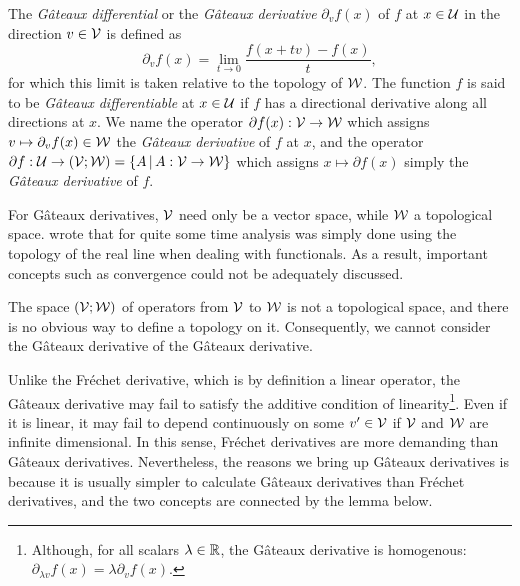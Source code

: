 \begin{definition}
  The \emph{Gâteaux differential} or the \emph{Gâteaux derivative} $\partial_v f(x)$ of $f$ at $x \in {\mathcal U}$ in the direction $v\in{\mathcal V}$ is defined as
  \[
    \partial_v f(x) = \lim_{t \to 0} \frac{f(x + t v) - f(x)}{t},  %
  \]  
  for which this limit is taken relative to the topology of ${\mathcal W}$.
  The function $f$ is said to be \emph{Gâteaux differentiable} at $x\in{\mathcal U}$ if $f$ has a directional derivative along all directions at $x$.
  We name the operator $\partial f(x):{\mathcal V}\to{\mathcal W}$ which assigns $v \mapsto \partial_v f(x) \in {\mathcal W}$ the \emph{Gâteaux derivative} of $f$ at $x$, and the operator $\partial f:{\mathcal U}\to({\mathcal V};{\mathcal W}) = \{A \,|\, A:{\mathcal V}\to{\mathcal W} \}$ which assigns $x \mapsto \partial f(x)$ simply the \emph{Gâteaux derivative} of $f$.
  
\end{definition}

\begin{remark}
  For Gâteaux derivatives, ${\mathcal V}$ need only be a vector space, while ${\mathcal W}$ a topological space.
  \citet[p. 55]{tapia1971diff} wrote that for quite some time analysis was simply done using the topology of the real line when dealing with functionals.
  As a result, important concepts such as convergence could not be adequately discussed.
\end{remark}

\begin{remark}
  The space $({\mathcal V};{\mathcal W})$ of operators from ${\mathcal V}$ to ${\mathcal W}$ is not a topological space, and there is no obvious way to define a topology on it.
  Consequently, we cannot consider the Gâteaux derivative of the Gâteaux derivative.
\end{remark}

Unlike the Fréchet derivative, which is by definition a linear operator, the Gâteaux derivative may fail to satisfy the additive condition of linearity\footnote{Although, for all scalars $\lambda \in \mathbb{R}$, the Gâteaux derivative is homogenous: $\partial_{\lambda v}f(x) = \lambda \partial_v f(x)$.}.
Even if it is linear, it may fail to depend continuously on some $v'\in{\mathcal V}$ if ${\mathcal V}$ and ${\mathcal W}$ are infinite dimensional.
In this sense, Fréchet derivatives are more demanding than Gâteaux derivatives.
Nevertheless, the reasons we bring up Gâteaux derivatives is because it is usually simpler to calculate Gâteaux derivatives than Fréchet derivatives, and the two concepts are connected by the lemma below.

